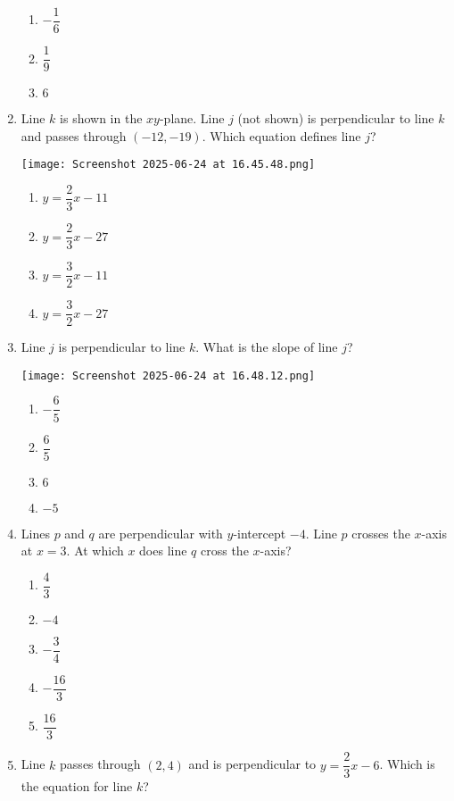\documentclass[12pt]{exam}
\begin{document}
\begin{enumerate}
\begin{enumerate}[label=\Alph*)]
        \item $-\dfrac{1}{6}$
        \item $\dfrac{1}{9}$
        \item $6$
    \end{enumerate}
    \item Line $k$ is shown in the $xy$-plane. Line $j$ (not shown) is perpendicular to line $k$ and passes through $(-12,-19)$. Which equation defines line $j$?
    \begin{center}
        \texttt{[image: Screenshot 2025-06-24 at 16.45.48.png]}
    \end{center}
    \begin{enumerate}[label=\Alph*)]
        \item $y = \dfrac{2}{3}x - 11$
        \item $y = \dfrac{2}{3}x - 27$
        \item $y = \dfrac{3}{2}x - 11$
        \item $y = \dfrac{3}{2}x - 27$
    \end{enumerate}
    \item Line $j$ is perpendicular to line $k$. What is the slope of line $j$?
    \begin{center}
        \texttt{[image: Screenshot 2025-06-24 at 16.48.12.png]}
    \end{center}
    \begin{enumerate}[label=\Alph*)]
        \item $-\dfrac{6}{5}$
        \item $\dfrac{6}{5}$
        \item $6$
        \item $-5$
    \end{enumerate}
    \item Lines $p$ and $q$ are perpendicular with $y$-intercept $-4$. Line $p$ crosses the $x$-axis at $x=3$. At which $x$ does line $q$ cross the $x$-axis?
    \begin{enumerate}[label=\Alph*)]
        \item $\dfrac{4}{3}$
        \item $-4$
        \item $-\dfrac{3}{4}$
        \item $-\dfrac{16}{3}$
        \item $\dfrac{16}{3}$
    \end{enumerate}
    \item Line $k$ passes through $(2,4)$ and is perpendicular to $y = \dfrac{2}{3}x - 6$. Which is the equation for line $k$?

\end{enumerate}
\end{document}
